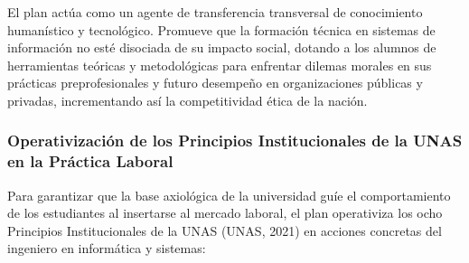 \documentclass[12pt,a4paper]{article}
\begin{document}
El plan actúa como un agente de transferencia transversal de conocimiento humanístico y tecnológico. Promueve que la formación técnica en sistemas de información no esté disociada de su impacto social, dotando a los alumnos de herramientas teóricas y metodológicas para enfrentar dilemas morales en sus prácticas preprofesionales y futuro desempeño en organizaciones públicas y privadas, incrementando así la competitividad ética de la nación.

\subsubsection{Operativización de los Principios Institucionales de la UNAS en la Práctica Laboral}
Para garantizar que la base axiológica de la universidad guíe el comportamiento de los estudiantes al insertarse al mercado laboral, el plan operativiza los ocho Principios Institucionales de la UNAS (UNAS, 2021) en acciones concretas del ingeniero en informática y sistemas:
\end{document}
